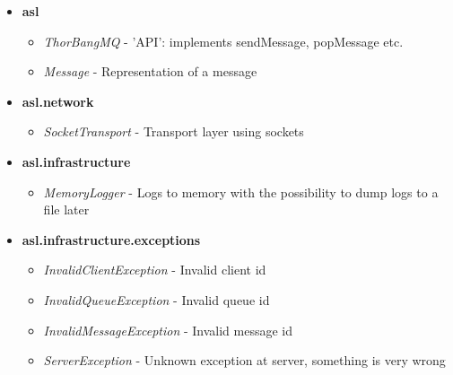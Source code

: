 \documentclass{article}
\begin{document}
            \begin{itemize}
                \item \textbf{asl}
                    \begin{itemize}
                        \item \textit{ThorBangMQ} - 'API': implements sendMessage, popMessage etc.
                        \item \textit{Message} - Representation of a message
                    \end{itemize}
                \item \textbf{asl.network}
                \begin{itemize}
                     \item \textit{SocketTransport} - Transport layer using sockets
                 \end{itemize} 
                \item \textbf{asl.infrastructure}
                 \begin{itemize}
                    \item \textit{MemoryLogger} - Logs to memory with the possibility to dump logs to a file later
                \end{itemize}
                \item \textbf{asl.infrastructure.exceptions}
                \begin{itemize}
                    \item \textit{InvalidClientException} - Invalid client id
                    \item \textit{InvalidQueueException} - Invalid queue id
                    \item \textit{InvalidMessageException} - Invalid message id
                    \item \textit{ServerException} - Unknown exception at server, something is very wrong
                \end{itemize}
            \end{itemize}
\end{document}
